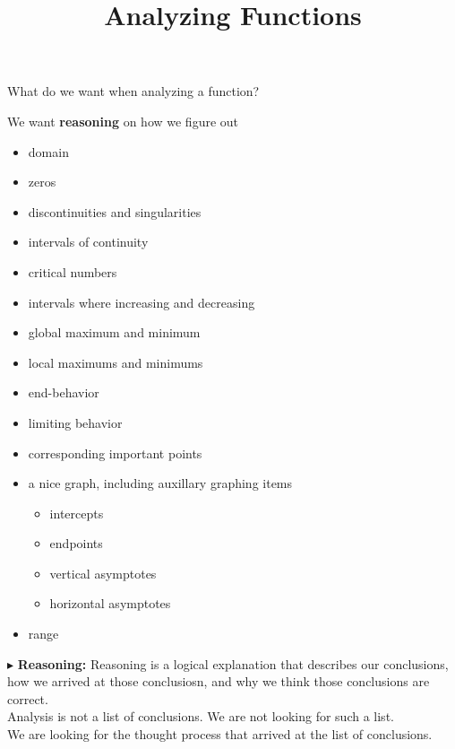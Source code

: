 \documentclass{ximera}
\title{Analyzing Functions}
\begin{document}
\begin{abstract}
%
\end{abstract}
\maketitle






What do we want when analyzing a function?


We want \textbf{\textcolor{red!80!black}{reasoning}} on how we figure out

\begin{itemize}
\item domain
\item zeros 
\item discontinuities and singularities
\item intervals of continuity
\item critical numbers
\item intervals where increasing and decreasing
\item global maximum and minimum
\item local maximums and minimums
\item end-behavior
\item limiting behavior
\item corresponding important points
\item a nice graph, including auxillary graphing items
\begin{itemize}
	\item intercepts
	\item endpoints
	\item vertical asymptotes
	\item horizontal asymptotes
\end{itemize}
\item range
\end{itemize}



$\blacktriangleright$ \textbf{\textcolor{red!80!black}{Reasoning:}} Reasoning is a logical explanation that describes our conclusions, how we arrived at those conclusiosn, and why we think those conclusions are correct. \\

Analysis is not a list of conclusions. We are not looking for such a list. \\

We are looking for the thought process that arrived at the list of conclusions. \\
\end{document}
